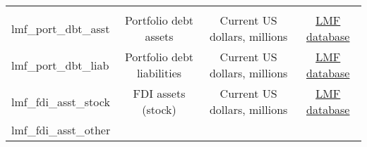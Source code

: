 \documentclass[]{article}
\begin{document}
\begin{longtable}[]{@{}lccc@{}}
\begin{minipage}[t]{0.15\columnwidth}
\end{minipage}\tabularnewline
\begin{minipage}[t]{0.14\columnwidth}\raggedright\strut
lmf\_port\_dbt\_asst\strut
\end{minipage} & \begin{minipage}[t]{0.36\columnwidth}\centering\strut
Portfolio debt assets\strut
\end{minipage} & \begin{minipage}[t]{0.24\columnwidth}\centering\strut
Current US dollars, millions\strut
\end{minipage} & \begin{minipage}[t]{0.15\columnwidth}\centering\strut
\href{http://www.philiplane.org/EWN.html}{LMF database}\strut
\end{minipage}\tabularnewline
\begin{minipage}[t]{0.14\columnwidth}\raggedright\strut
lmf\_port\_dbt\_liab\strut
\end{minipage} & \begin{minipage}[t]{0.36\columnwidth}\centering\strut
Portfolio debt liabilities\strut
\end{minipage} & \begin{minipage}[t]{0.24\columnwidth}\centering\strut
Current US dollars, millions\strut
\end{minipage} & \begin{minipage}[t]{0.15\columnwidth}\centering\strut
\href{http://www.philiplane.org/EWN.html}{LMF database}\strut
\end{minipage}\tabularnewline
\begin{minipage}[t]{0.14\columnwidth}\raggedright\strut
lmf\_fdi\_asst\_stock\strut
\end{minipage} & \begin{minipage}[t]{0.36\columnwidth}\centering\strut
FDI assets (stock)\strut
\end{minipage} & \begin{minipage}[t]{0.24\columnwidth}\centering\strut
Current US dollars, millions\strut
\end{minipage} & \begin{minipage}[t]{0.15\columnwidth}\centering\strut
\href{http://www.philiplane.org/EWN.html}{LMF database}\strut
\end{minipage}\tabularnewline
\begin{minipage}[t]{0.14\columnwidth}\raggedright\strut
lmf\_fdi\_asst\_other\strut
\end{minipage} & \begin{minipage}[t]{0.36\columnwidth}\centering\strut

\end{minipage}
\end{longtable}
\end{document}
